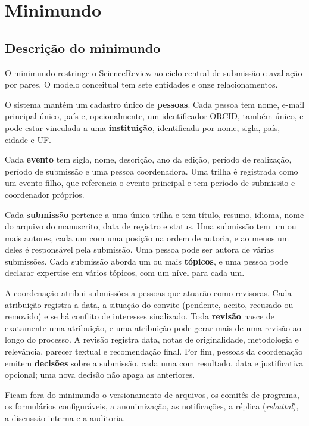 \documentclass[12pt,a4paper]{article}
\begin{document}
\section{Minimundo}\label{sec:minimundo}

\subsection{Descrição do minimundo}
O minimundo restringe o ScienceReview ao ciclo central de submissão e avaliação por
pares. O modelo conceitual tem sete entidades e onze relacionamentos.

O sistema mantém um cadastro único de \textbf{pessoas}. Cada pessoa tem nome, e-mail
principal único, país e, opcionalmente, um identificador ORCID, também único, e pode
estar vinculada a uma \textbf{instituição}, identificada por nome, sigla, país, cidade
e UF.

Cada \textbf{evento} tem sigla, nome, descrição, ano da edição, período de realização,
período de submissão e uma pessoa coordenadora. Uma trilha é registrada como um evento
filho, que referencia o evento principal e tem período de submissão e coordenador
próprios.

Cada \textbf{submissão} pertence a uma única trilha e tem título, resumo, idioma, nome
do arquivo do manuscrito, data de registro e status. Uma submissão tem um ou mais
autores, cada um com uma posição na ordem de autoria, e ao menos um deles é
responsável pela submissão. Uma pessoa pode ser autora de várias submissões. Cada
submissão aborda um ou mais \textbf{tópicos}, e uma pessoa pode declarar expertise em
vários tópicos, com um nível para cada um.

A coordenação atribui submissões a pessoas que atuarão como revisoras. Cada atribuição
registra a data, a situação do convite (pendente, aceito, recusado ou removido) e se há
conflito de interesses sinalizado. Toda \textbf{revisão} nasce de
exatamente uma atribuição, e uma atribuição pode gerar mais de uma revisão ao longo do
processo. A revisão registra data, notas de originalidade, metodologia e relevância,
parecer textual e recomendação final. Por fim, pessoas da coordenação emitem
\textbf{decisões} sobre a submissão, cada uma com resultado, data e justificativa
opcional; uma nova decisão não apaga as anteriores.

Ficam fora do minimundo o versionamento de arquivos, os comitês de programa, os
formulários configuráveis, a anonimização, as notificações, a
réplica (\textit{rebuttal}), a discussão interna e a auditoria.
\end{document}
